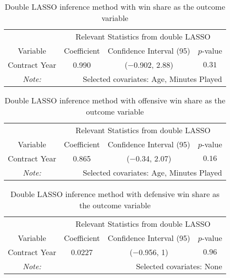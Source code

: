 \documentclass[12pt]{article}
\begin{document}
	\begin{table}[!htbp]
		\centering
		\caption{Double LASSO inference method with win share as the outcome variable}
		\label{lassows} 
		\begin{tabular}{*4c}
			\toprule
			& \multicolumn{3}{c}{Relevant Statistics from double LASSO} \\
			\cmidrule(lr){2-4}
			Variable & Coefficient  & Confidence Interval (95) & $p$-value \\
			\midrule
			Contract Year & 0.990       & ($-$0.902, 2.88) & $0.31$       \\
			\bottomrule
			\textit{Note:}  & \multicolumn{3}{r}{Selected covariates: Age, Minutes Played} \\ 
		\end{tabular}
	\end{table}

	\begin{table}[!htbp]
		\centering
		\caption{Double LASSO inference method with offensive win share as the outcome variable}
		\label{lassoows} 
		\begin{tabular}{*4c}
			\toprule
			& \multicolumn{3}{c}{Relevant Statistics from double LASSO} \\
			\cmidrule(lr){2-4}
			Variable & Coefficient  & Confidence Interval (95) & $p$-value \\
			\midrule
			Contract Year & 0.865       & ($-$0.34, 2.07) & $0.16$       \\
			\bottomrule
			\textit{Note:}  & \multicolumn{3}{r}{Selected covariates: Age, Minutes Played} \\
		\end{tabular}
	\end{table}

	\begin{table}[!htbp]
		\centering
		\caption{Double LASSO inference method with defensive win share as the outcome variable}
		\label{lassodws} 
		\begin{tabular}{*4c}
			\toprule
			& \multicolumn{3}{c}{Relevant Statistics from double LASSO} \\
			\cmidrule(lr){2-4}
			Variable & Coefficient  & Confidence Interval (95) & $p$-value \\
			\midrule
			Contract Year & 0.0227       & ($-$0.956, 1) & $0.96$       \\
			\bottomrule
			\textit{Note:}  & \multicolumn{3}{r}{Selected covariates: None} \\
		\end{tabular}
	\end{table}
\end{document}
